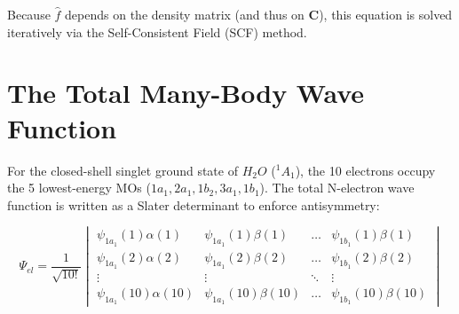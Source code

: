 \documentclass[12pt]{article}
\begin{document}
Because $\hat{f}$ depends on the density matrix (and thus on $\mathbf{C}$), this equation is solved iteratively via the Self-Consistent Field (SCF) method.

\section{The Total Many-Body Wave Function}
For the closed-shell singlet ground state of $H_2O$ (${}^1A_1$), the 10 electrons occupy the 5 lowest-energy MOs ($1a_1, 2a_1, 1b_2, 3a_1, 1b_1$). The total N-electron wave function is written as a Slater determinant to enforce antisymmetry:

\begin{equation}
\Psi_{el} = \frac{1}{\sqrt{10!}} 
\begin{vmatrix}
\psi_{1a_1}(1)\alpha(1) & \psi_{1a_1}(1)\beta(1) & \dots & \psi_{1b_1}(1)\beta(1) \\
\psi_{1a_1}(2)\alpha(2) & \psi_{1a_1}(2)\beta(2) & \dots & \psi_{1b_1}(2)\beta(2) \\
\vdots & \vdots & \ddots & \vdots \\
\psi_{1a_1}(10)\alpha(10) & \psi_{1a_1}(10)\beta(10) & \dots & \psi_{1b_1}(10)\beta(10)
\end{vmatrix}
\end{equation}
\end{document}
